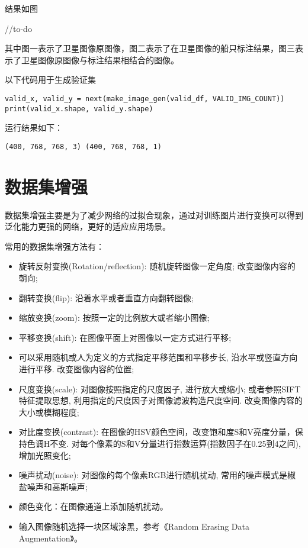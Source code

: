 结果如图

//to-do

其中图一表示了卫星图像原图像，图二表示了在卫星图像的船只标注结果，图三表示了卫星图像原图像与标注结果相结合的图像。

以下代码用于生成验证集

\begin{verbatim}
valid_x, valid_y = next(make_image_gen(valid_df, VALID_IMG_COUNT))
print(valid_x.shape, valid_y.shape)
\end{verbatim}

运行结果如下：

\begin{verbatim}
(400, 768, 768, 3) (400, 768, 768, 1)
\end{verbatim}

\section{数据集增强}

数据集增强主要是为了减少网络的过拟合现象，通过对训练图片进行变换可以得到泛化能力更强的网络，更好的适应应用场景。

常用的数据集增强方法有：

\begin{itemize}
\tightlist
\item
  旋转\textbar{}反射变换(Rotation/reflection): 随机旋转图像一定角度;
  改变图像内容的朝向;
\item
  翻转变换(flip): 沿着水平或者垂直方向翻转图像;
\item
  缩放变换(zoom): 按照一定的比例放大或者缩小图像;
\item
  平移变换(shift): 在图像平面上对图像以一定方式进行平移;
\item
  可以采用随机或人为定义的方式指定平移范围和平移步长,
  沿水平或竖直方向进行平移. 改变图像内容的位置;
\item
  尺度变换(scale): 对图像按照指定的尺度因子, 进行放大或缩小;
  或者参照SIFT特征提取思想, 利用指定的尺度因子对图像滤波构造尺度空间.
  改变图像内容的大小或模糊程度;
\item
  对比度变换(contrast):
  在图像的HSV颜色空间，改变饱和度S和V亮度分量，保持色调H不变.
  对每个像素的S和V分量进行指数运算(指数因子在0.25到4之间), 增加光照变化;
\item
  噪声扰动(noise): 对图像的每个像素RGB进行随机扰动,
  常用的噪声模式是椒盐噪声和高斯噪声;
\item
  颜色变化：在图像通道上添加随机扰动。
\item
  输入图像随机选择一块区域涂黑，参考《Random Erasing Data
  Augmentation》。
\end{itemize}

